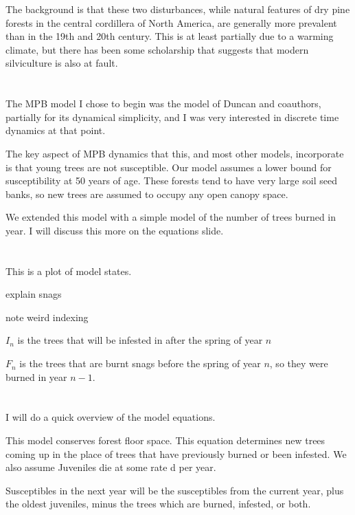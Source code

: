 \documentclass{article}
\begin{document}
The background is that these two disturbances, while natural features of dry pine forests in the central cordillera of North America, are generally more prevalent than in the 19th and 20th century. This is at least partially due to a warming climate, but there has been some scholarship that suggests that modern silviculture is also at fault. 


\section{}

The MPB model I chose to begin was the model of Duncan and coauthors, partially for its dynamical simplicity, and I was very interested in discrete time dynamics at that point.

The key aspect of MPB dynamics that this, and most other models, incorporate is that young trees are not susceptible. Our model assumes a lower bound for susceptibility at 50 years of age. These forests tend to have very large soil seed banks, so new trees are assumed to occupy any open canopy space.  

We extended this model with a simple model of the number of trees burned in year. I will discuss this more on the equations slide.
\section{}

This is a plot of model states.

explain snags

note weird indexing

$I_n$ is the trees that will be infested in after the spring of year $n$

$F_n$ is the trees that are burnt snags before the spring of year $n$, so they were burned in year $n-1$.




\section{}

I will do a quick overview of the model equations.

This model conserves forest floor space. This equation determines new trees coming up in the place of trees that have previously burned or been infested. We also assume Juveniles die at some rate d per year. 

Susceptibles in the next year will be the susceptibles from the current year, plus the oldest juveniles, minus the trees which are burned, infested, or both.
\end{document}
